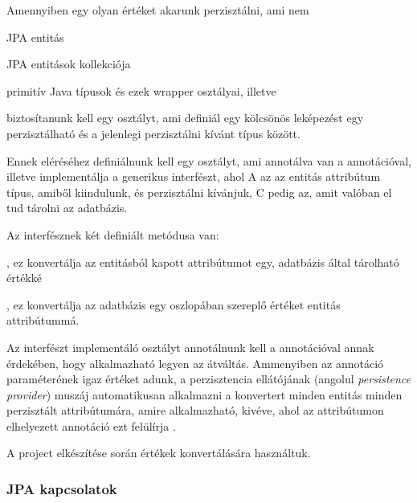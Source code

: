 Amennyiben egy olyan értéket akarunk perzisztálni, ami nem

\begin{listing}
	\item JPA entitás
	\item JPA entitások kollekciója
	\item primitív Java típusok és ezek wrapper osztályai, illetve 
\end{listing}

\noindent biztosítanunk kell egy osztályt, ami definiál egy kölcsönös leképezést egy perzisztálható és a jelenlegi perzisztálni kívánt típus között. \par

Ennek eléréséhez definiálnunk kell egy osztályt, ami annotálva van a  annotációval, illetve implementálja a  generikus interfészt, ahol A az az entitás attribútum típus, amiből kiindulunk, és perzisztálni kívánjuk, C pedig az, amit valóban el tud tárolni az adatbázis. \par

Az  interfésznek két definiált metódusa van:

\begin{listing}
	\item {}, ez konvertálja az entitásból kapott attribútumot egy, adatbázis által tárolható értékké
	\item {}, ez konvertálja az adatbázis egy oszlopában szereplő értéket entitás attribútummá.
\end{listing}

Az interfészt implementáló osztályt annotálnunk kell a  annotációval annak érdekében, hogy alkalmazható legyen az átváltás. Ammenyiben az annotáció  paraméterének igaz értéket adunk, a perzisztencia ellátójának (angolul \emph{persistence provider}) muszáj automatikusan alkalmazni a konvertert minden entitás minden perzisztált attribútumára, amire alkalmazható, kivéve, ahol az attribútumon elhelyezett  annotáció ezt felülírja \cite{converterDocumentation}.

A project elkészítése során  értékek konvertálására használtuk.


\subsubsection{JPA kapcsolatok}

